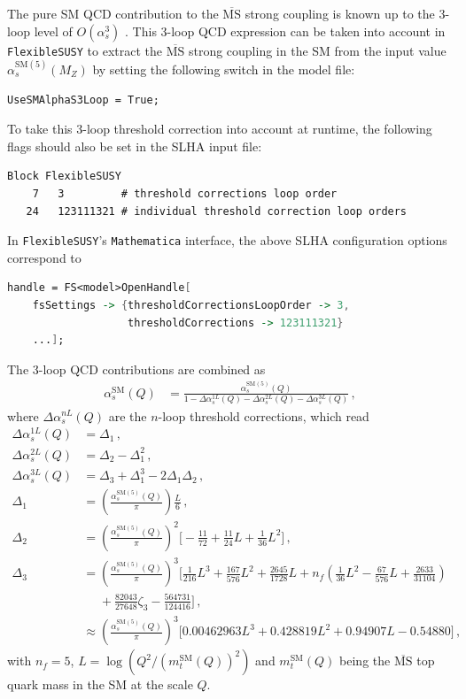 \documentclass[final,3p,11pt,pdflatex]{elsarticle}
\makeatletter
\newcommand{\fs}{\texttt{FlexibleSUSY}\@\xspace}
\newcommand{\mathematica}{\texttt{Ma\-the\-ma\-ti\-ca}\xspace}
\newcommand{\ol}[1]{\overline{#1}}
\newcommand{\MSbar}{\ensuremath{\ol{\text{MS}}}\xspace}
\newcommand{\SM}{\ensuremath{\text{SM}}\xspace}
\def\as{\alpha_s}
\makeatother
\begin{document}
The pure SM QCD contribution to the \MSbar strong coupling is known up
to the 3-loop level of $O(\as^3)$
\cite{Rodrigo:1993hc,Rodrigo:1997zd,Chetyrkin:1997un,Chetyrkin:2000yt}.
This 3-loop QCD expression can be taken into account in \fs to extract
the \MSbar strong coupling in the SM from the input value
$\as^{\SM(5)}(M_Z)$ by setting the following switch in the
model file:
%
\begin{lstlisting}
UseSMAlphaS3Loop = True;
\end{lstlisting}
%
To take this 3-loop threshold correction into account at runtime, the
following flags should also be set in the SLHA input file:
%
\begin{lstlisting}
Block FlexibleSUSY
    7   3         # threshold corrections loop order
   24   123111321 # individual threshold correction loop orders
\end{lstlisting}
%
In \fs's \mathematica interface, the above SLHA configuration options
correspond to
%
\begin{lstlisting}[language=Mathematica]
handle = FS<model>OpenHandle[
    fsSettings -> {thresholdCorrectionsLoopOrder -> 3,
                   thresholdCorrections -> 123111321}
    ...];
\end{lstlisting}
%
The 3-loop QCD contributions are combined as
%
\begin{align}
  \as^{\SM}(Q) &=
  \frac{\as^{\SM(5)}(Q)}{1 - \Delta\as^{1L}(Q)
    - \Delta\as^{2L}(Q) - \Delta\as^{3L}(Q)} \,,
\end{align}
%
where $\Delta\as^{nL}(Q)$ are the $n$-loop threshold corrections,
which read \cite{Chetyrkin:2000yt}
%
\begin{align}
  \Delta\as^{1L}(Q) &= \Delta_1 \,,\\
  \Delta\as^{2L}(Q) &= \Delta_2 - \Delta_1^2 \,,\\
  \Delta\as^{3L}(Q) &= \Delta_3 + \Delta_1^3 - 2\Delta_1\Delta_2 \,,\\
  \Delta_1 &= \left(\frac{\as^{\SM(5)}(Q)}{\pi}\right) \frac{L}{6} \,, \\
  \Delta_2 &= \left(\frac{\as^{\SM(5)}(Q)}{\pi}\right)^2 \Bigg[
  -\frac{11}{72} + \frac{11}{24} L + \frac{1}{36} L^2
  \Bigg] \,,\\
  \Delta_3 &=
  \left(\frac{\as^{\SM(5)}(Q)}{\pi}\right)^3 \Bigg[
  \frac{1}{216} L^3
  + \frac{167}{576} L^2
  + \frac{2645}{1728}L
  + n_f \left(\frac{1}{36} L^2
  - \frac{67}{576} L
  + \frac{2633}{31104}\right) \nonumber \\
  &\phantom{={}}
  + \frac{82043}{27648} \zeta_3
  - \frac{564731}{124416}
  \Bigg] \,, \\
  &\approx
  \left(\frac{\as^{\SM(5)}(Q)}{\pi}\right)^3 \Bigg[
  0.00462963 L^3
  + 0.428819 L^2
  + 0.94907 L
  - 0.54880 \Bigg] \,,
\end{align}
%
with $n_f = 5$, $L = \log(Q^2/(m_t^{\SM}(Q))^2)$ and $m_t^{\SM}(Q)$ being the \MSbar
top quark mass in the SM at the scale $Q$.
\end{document}
